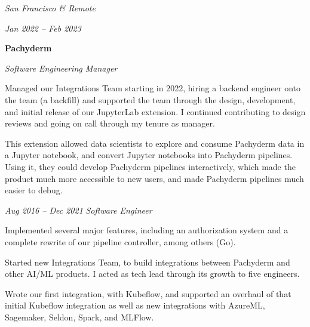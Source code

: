 \documentclass[10pt, letterpaper]{article}
\begin{document}
\vspace{0.2 cm}

\begin{twocolentry}{
    \textit{San Francisco \& Remote}

    \textit{Jan 2022 – Feb 2023}
}
    \textbf{Pachyderm}

    \textit{Software Engineering Manager}
\end{twocolentry}

\vspace{0.1 cm}

\begin{onecolentry}
    \begin{highlights}
        \item Managed our Integrations Team starting in 2022, hiring a backend engineer onto the team (a backfill) and supported the team through the design, development, and initial release of our JupyterLab extension. I continued contributing to design reviews and going on call through my tenure as manager.
        \item This extension allowed data scientists to explore and consume Pachyderm data in a Jupyter notebook, and convert Jupyter notebooks into Pachyderm pipelines. Using it, they could develop Pachyderm pipelines interactively, which made the product much more accessible to new users, and made Pachyderm pipelines much easier to debug.
    \end{highlights}
\end{onecolentry}

\vspace{0.2 cm}

\begin{twocolentry}{
    \textit{Aug 2016 – Dec 2021}
}
    \textit{Software Engineer}
\end{twocolentry}

\vspace{0.1 cm}

\begin{onecolentry}
    \begin{highlights}
        \item Implemented several major features, including an authorization system and a complete rewrite of our pipeline controller, among others (Go).
        \item Started new Integrations Team, to build integrations between Pachyderm and other AI/ML products. I acted as tech lead through its growth to five engineers.
        \item Wrote our first integration, with Kubeflow, and supported an overhaul of that initial Kubeflow integration as well as new integrations with AzureML, Sagemaker, Seldon, Spark, and MLFlow.
    \end{highlights}
  \end{onecolentry}
\end{document}
